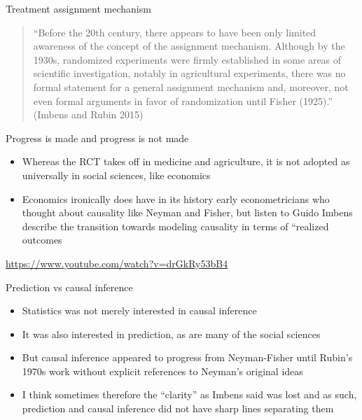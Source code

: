 \documentclass{beamer}
\begin{document}
\begin{frame}{Treatment assignment mechanism}

\begin{quote}

``Before the 20th century, there appears to have been only limited awareness of the concept of the assignment mechanism.  Although by the 1930s, randomized experiments were firmly established in some areas of scientific investigation, notably in agricultural experiments, there was no formal statement for a general assignment mechanism and, moreover, not even formal arguments in favor of randomization until Fisher (1925).'' (Imbens and Rubin 2015)

\end{quote}

\end{frame}

\begin{frame}{Progress is made and progress is not made}

\begin{itemize}

\item Whereas the RCT takes off in medicine and agriculture, it is not adopted as universally in social sciences, like economics
\item Economics ironically does have in its history early econometricians who thought about causality like Neyman and Fisher, but listen to Guido Imbens describe the transition towards modeling causality in terms of ``realized outcomes

\end{itemize}

\bigskip

\url{https://www.youtube.com/watch?v=drGkRy53bB4}

\end{frame}

\begin{frame}{Prediction vs causal inference}

\begin{itemize}

\item Statistics was not merely interested in causal inference
\item It was also interested in prediction, as are many of the social sciences
\item But causal inference appeared to progress from Neyman-Fisher until Rubin's 1970s work without explicit references to Neyman's original ideas
\item I think sometimes therefore the ``clarity'' as Imbens said was lost and as such, prediction and causal inference did not have sharp lines separating them

\end{itemize}

\end{frame}
\end{document}
